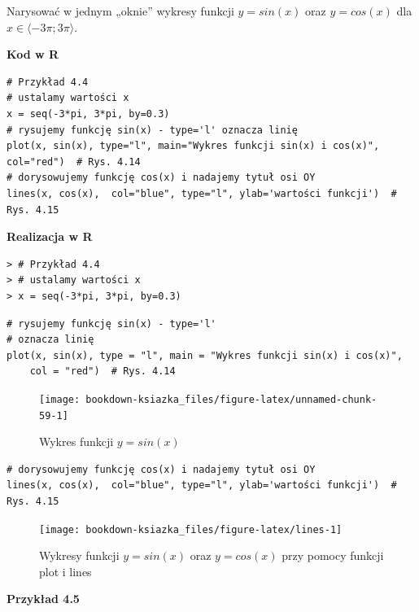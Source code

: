 \documentclass[12pt,B5paper,]{book}
\begin{document}
Narysować w jednym „oknie'' wykresy funkcji \(y=sin(x)\) oraz
\(y=cos(x)\) dla \(x \in \langle -3 \pi;3 \pi \rangle\).

\vspace{0.8cm} \textbf{Kod w R}

\begin{verbatim}
# Przykład 4.4
# ustalamy wartości x
x = seq(-3*pi, 3*pi, by=0.3)
# rysujemy funkcję sin(x) - type='l' oznacza linię
plot(x, sin(x), type="l", main="Wykres funkcji sin(x) i cos(x)", col="red")  # Rys. 4.14
# dorysowujemy funkcję cos(x) i nadajemy tytuł osi OY
lines(x, cos(x),  col="blue", type="l", ylab='wartości funkcji')  # Rys. 4.15
\end{verbatim}

\vspace{0.8cm} \textbf{Realizacja w R}

\begin{verbatim}
> # Przykład 4.4
> # ustalamy wartości x
> x = seq(-3*pi, 3*pi, by=0.3)
\end{verbatim}

\begin{verbatim}
# rysujemy funkcję sin(x) - type='l'
# oznacza linię
plot(x, sin(x), type = "l", main = "Wykres funkcji sin(x) i cos(x)", 
    col = "red")  # Rys. 4.14
\end{verbatim}

\begin{figure}[H]

{\centering \texttt{[image: bookdown-ksiazka\_files/figure-latex/unnamed-chunk-59-1]} 

}

\caption{Wykres funkcji $y=sin(x)$}\label{fig:unnamed-chunk-59}
\end{figure}

\begin{verbatim}
# dorysowujemy funkcję cos(x) i nadajemy tytuł osi OY
lines(x, cos(x),  col="blue", type="l", ylab='wartości funkcji')  # Rys. 4.15
\end{verbatim}

\begin{figure}[H]

{\centering \texttt{[image: bookdown-ksiazka\_files/figure-latex/lines-1]} 

}

\caption{Wykresy funkcji $y=sin(x)$ oraz $y=cos(x)$ przy pomocy funkcji plot i lines}\label{fig:lines}
\end{figure}

\vspace{0.8cm} \textbf{Przykład 4.5}
\end{document}
